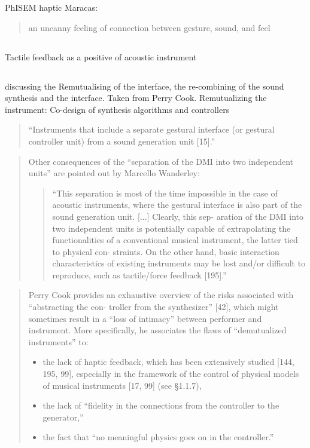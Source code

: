 PhISEM haptic Maracas:
\begin{quotation}
     an uncanny feeling of connection between gesture, sound, and feel
\end{quotation}



\subsection{\cite{magnusson_survey_2007}} Tactile feedback as a positive of
acoustic instrument


\subsection{\cite{michon_hybrid_2018}}

\textcite{Michon} discussing the Remutualising of the interface, the
re-combining of the sound synthesis and the interface. Taken from Perry Cook.
Remutualizing the instrument: Co-design of synthesis algorithms and controllers

\begin{quotation}
    “Instruments that include a separate gestural interface (or gestural
    controller unit) from a sound generation unit [15].”
\end{quotation}

\begin{quotation}
    Other consequences of the “separation of the DMI into two independent units”
    are pointed out by Marcello Wanderley:
    \begin{quotation}        
“This separation is most of the time impossible in the case of acoustic
instruments, where the gestural interface is also part of the sound generation
unit. [...] Clearly, this sep- aration of the DMI into two independent units is
potentially capable of extrapolating the functionalities of a conventional
musical instrument, the latter tied to physical con- straints. On the other
hand, basic interaction characteristics of existing instruments may be lost
and/or difficult to reproduce, such as tactile/force feedback [195].”
\end{quotation}
\end{quotation}

\begin{quotation}
    
Perry Cook provides an exhaustive overview of the risks associated with
“abstracting the con- troller from the synthesizer” [42], which might sometimes
result in a “loss of intimacy” between performer and instrument. More
specifically, he associates the flaws of “demutualized instruments” to:
\begin{itemize}
\item  the lack of haptic feedback, which has been extensively studied [144,
195, 99], especially in the framework of the control of physical models of
musical instruments [17, 99] (see §1.1.7),
\item  the lack of “fidelity in the connections from the controller to the
generator,”
\item  the fact that “no meaningful physics goes on in the controller.”
\end{itemize}
\end{quotation}

